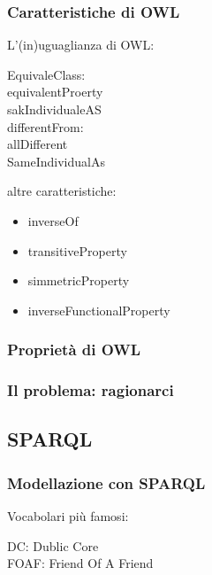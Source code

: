 			\subsubsection{Caratteristiche di OWL}
			
				L'(in)uguaglianza di OWL:	
					\begin{description}
						\item[EquivaleClass:]
						\item[equivalentProerty]
						\item[sakIndividualeAS]
						\item[differentFrom:]
						\item[allDifferent]
						\item[SameIndividualAs]
					\end{description}
					
				altre caratteristiche:
				
					\begin{itemize}
						\item inverseOf
						\item transitiveProperty
						\item simmetricProperty
						\item inverseFunctionalProperty
					\end{itemize}
					
			\subsubsection{Proprietà di OWL}
				
			\subsubsection{Il problema: ragionarci}
			
			
		\subsection{SPARQL}
		
			\subsubsection{Modellazione con SPARQL}		
				
				Vocabolari più famosi:
				\begin{description}
					\item[DC: Dublic Core]
					\item[FOAF: Friend Of A Friend]
				\end{description}		
		
